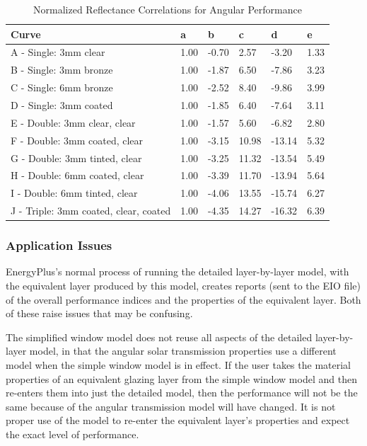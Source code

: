 \begin{table}[tbp]
  \caption{Normalized Reflectance Correlations for Angular Performance}
  \label{tab:normalized-reflectance-correlations-for}
  \centering
  \begin{tabular}{llllll}
  \hline
  Curve                                 & a    & b     & c     & d      & e    \\ \hline
  A - Single: 3mm clear                 & 1.00 & -0.70 & 2.57  & -3.20  & 1.33 \\
  B - Single: 3mm bronze                & 1.00 & -1.87 & 6.50  & -7.86  & 3.23 \\
  C - Single: 6mm bronze                & 1.00 & -2.52 & 8.40  & -9.86  & 3.99 \\
  D - Single: 3mm coated                & 1.00 & -1.85 & 6.40  & -7.64  & 3.11 \\
  E - Double: 3mm clear, clear          & 1.00 & -1.57 & 5.60  & -6.82  & 2.80 \\
  F - Double: 3mm coated, clear         & 1.00 & -3.15 & 10.98 & -13.14 & 5.32 \\
  G - Double: 3mm tinted, clear         & 1.00 & -3.25 & 11.32 & -13.54 & 5.49 \\
  H - Double: 6mm coated, clear         & 1.00 & -3.39 & 11.70 & -13.94 & 5.64 \\
  I - Double: 6mm tinted, clear         & 1.00 & -4.06 & 13.55 & -15.74 & 6.27 \\
  J - Triple: 3mm coated, clear, coated & 1.00 & -4.35 & 14.27 & -16.32 & 6.39 \\ \hline
  \end{tabular}
\end{table}

\subsubsection{Application Issues}\label{application-issues}

EnergyPlus's normal process of running the detailed layer-by-layer model, with the equivalent layer produced by this model, creates reports (sent to the EIO file) of the overall performance indices and the properties of the equivalent layer. Both of these raise issues that may be confusing.

The simplified window model does not reuse all aspects of the detailed layer-by-layer model, in that the angular solar transmission properties use a different model when the simple window model is in effect. If the user takes the material properties of an equivalent glazing layer from the simple window model and then re-enters them into just the detailed model, then the performance will not be the same because of the angular transmission model will have changed. It is not proper use of the model to re-enter the equivalent layer's properties and expect the exact level of performance.

